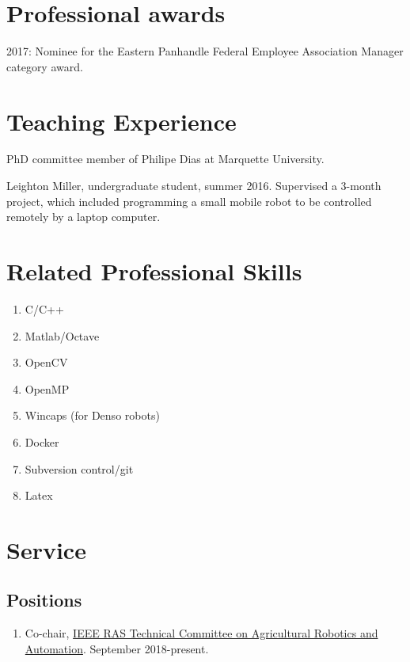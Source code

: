 \documentclass[letterpaper,11pt]{article}
\begin{document}
\section{Professional awards}
{2017: Nominee for the Eastern Panhandle Federal Employee Association Manager category award.}  

\section{Teaching Experience}
\begin{enumerate}[noitemsep,leftmargin=*,label={[TE\arabic*]}]
\item{PhD committee member of Philipe Dias at Marquette University.}

\item {Leighton Miller, undergraduate student, summer 2016.  Supervised a 3-month project, which included programming a small mobile robot to be controlled remotely by a laptop computer.}
\end{enumerate}

\section{Related Professional Skills}
\begin{enumerate}[noitemsep, leftmargin=*,label={}]
\item{C/C++}
\item{Matlab/Octave}
\item{OpenCV}
\item{OpenMP}
\item{Wincaps (for Denso robots)}
\item{Docker}
\item{Subversion control/git}
\item{Latex}
\end{enumerate}


\section{Service}

\subsection{Positions}
\begin{enumerate}[noitemsep, leftmargin=*,label={}]
\item{Co-chair, \href{http://ieeeagra.com/}{IEEE RAS Technical Committee on Agricultural Robotics and Automation}.  September 2018-present.}
\end{enumerate}
\end{document}
